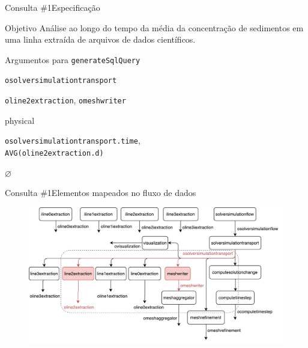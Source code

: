 \documentclass[12pt,compress,final]{beamer}
\newcommand{\nologo}{\setbeamertemplate{logo}{}} %
\begin{document}

% 
% 


{\nologo
\begin{frame}{Consulta \#1}{Especificação}

\begin{block}{Objetivo}
Análise ao longo do \alert{tempo} da média da \alert{concentração de sedimentos} em uma linha extraída de arquivos de dados científicos.
\end{block}

\begin{block}{Argumentos para \texttt{generateSqlQuery}}
\begin{description}
\item[\texttt{dsOrigins}] \texttt{osolversimulationtransport}
\item[\texttt{dsDestinations}] \texttt{oline2extraction}, \texttt{omeshwriter}
\item[\texttt{type}] physical
\item[\texttt{projections}] \texttt{osolversimulationtransport.time}, \\ \texttt{AVG(oline2extraction.d)}
\item[\texttt{selections}] $\varnothing$
\end{description}
\end{block}

\end{frame}
}


{\nologo
\begin{frame}{Consulta \#1}{Elementos mapeados no fluxo de dados}
\begin{figure}
\includegraphics[width=\textwidth]{img/slides-dataflow-1.pdf}
\hspace*{\fill}
\end{figure}
\end{frame}
}
\end{document}
